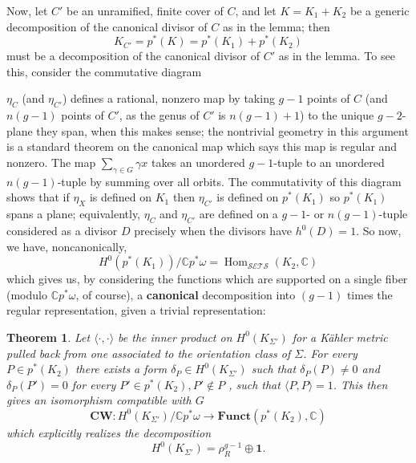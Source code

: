 \documentclass[11pt]{amsart}
\newtheorem{thm}{Theorem}
\numberwithin{thm}{section}
\begin{document}
Now, let $C'$ be an unramified, finite cover of $C$, and let $K = K_1 + K_2$ be a generic decomposition of the canonical divisor of $C$ as in the lemma; then
\[
K_{C'} = p^*(K) = p^*(K_1) + p^*(K_2)
\]
must be a decomposition of the canonical divisor of $C'$ as in the lemma.  To see this, consider the commutative diagram
\begin{center}
\mbox{}
\end{center}
$\eta_C$ (and $\eta_{C'}$) defines a rational, nonzero map by taking $g - 1$ points of $C$ (and $n(g-1)$ points of $C'$, as the genus of $C'$ is $n(g-1)+1$) to the unique $g-2$-plane they span, when this makes sense; the nontrivial geometry in this argument is a standard theorem on the canonical map which says this map is regular and nonzero.  The map $\sum_{\gamma\in G} \gamma x$ takes an unordered $g-1$-tuple to an unordered $n(g-1)$-tuple by summing over all orbits.  The commutativity of this diagram shows that if $\eta_X$ is defined on $K_1$ then $\eta_{C'}$ is defined on $p^*(K_1)$ so $p^*(K_1)$ spans a plane; equivalently, $\eta_C$ and $\eta_{C'}$ are defined on a $g-1$- or $n(g-1)$-tuple considered as a divisor $D$ precisely when the divisors have $h^0(D) = 1$.  So now, we have, noncanonically,
\[
H^0(p^*(K_1))/{\mathbb{C}} p^*\omega = {\operatorname{Hom}}_{\mathcal{SETS}}(K_2, {\mathbb{C}})
\]
which gives us, by considering the functions which are supported on a single fiber (modulo ${\mathbb{C}} p^*\omega$, of course), a \textbf{canonical} decomposition into $(g-1)$ times the regular representation, given a trivial representation:
\begin{thm}
Let $\langle\cdot,\cdot\rangle$ be the inner product on $H^0(K_{\Sigma'})$ for a K\"ahler metric pulled back from one associated to the orientation class of $\Sigma$. For every $P \in p^*(K_2)$ there exists a form $\delta_P \in H^0(K_{\Sigma'})$ such that $\delta_P(P)\neq 0$ and $\delta_P(P') = 0$ for every $P' \in p^*(K_2), P' \notin P$ , such that $\langle P, P\rangle = 1$. This then gives an isomorphism compatible with $G$
\[
\mathbf{CW}: H^0(K_{\Sigma'})/{\mathbb{C}} p^*\omega\rightarrow {\mathbf{Funct}}(p^*(K_2), {\mathbb{C}})
\]
which explicitly realizes the decomposition
\[
H^0(K_{\Sigma'}) = \rho_R^{g-1} \oplus {\mathbf{1}}.
\]
\end{thm}
\end{document}
